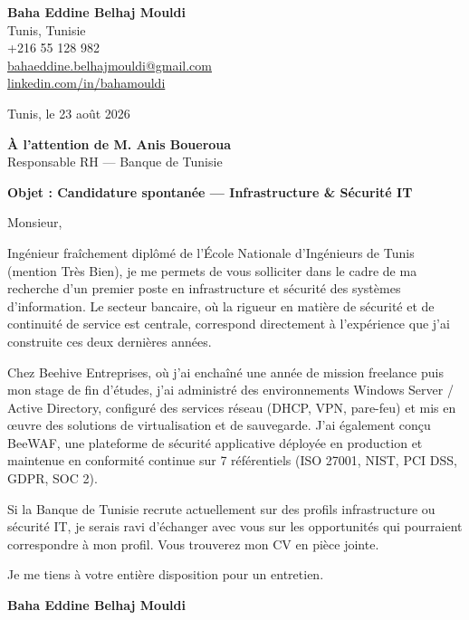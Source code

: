 \documentclass[a4paper,11pt]{article}
\begin{document}
\begin{flushright}
{\bfseries Baha Eddine Belhaj Mouldi}\\
Tunis, Tunisie\\
+216 55 128 982\\
\href{mailto:bahaeddine.belhajmouldi@gmail.com}{bahaeddine.belhajmouldi@gmail.com}\\
\href{https://linkedin.com/in/bahamouldi}{linkedin.com/in/bahamouldi}
\end{flushright}
\vspace{0.8cm}
\begin{flushleft}
Tunis, le 23 août 2026
\vspace{0.8cm}

{\bfseries À l'attention de M. Anis Boueroua}\\
Responsable RH --- Banque de Tunisie
\vspace{0.6cm}

{\bfseries Objet : Candidature spontanée --- Infrastructure \& Sécurité IT}
\end{flushleft}
\vspace{0.6cm}
Monsieur,

Ingénieur fraîchement diplômé de l'École Nationale d'Ingénieurs de Tunis (mention Très Bien), je me permets de vous solliciter dans le cadre de ma recherche d'un premier poste en infrastructure et sécurité des systèmes d'information. Le secteur bancaire, où la rigueur en matière de sécurité et de continuité de service est centrale, correspond directement à l'expérience que j'ai construite ces deux dernières années.

Chez Beehive Entreprises, où j'ai enchaîné une année de mission freelance puis mon stage de fin d'études, j'ai administré des environnements Windows Server / Active Directory, configuré des services réseau (DHCP, VPN, pare-feu) et mis en œuvre des solutions de virtualisation et de sauvegarde. J'ai également conçu BeeWAF, une plateforme de sécurité applicative déployée en production et maintenue en conformité continue sur 7 référentiels (ISO 27001, NIST, PCI DSS, GDPR, SOC 2).

Si la Banque de Tunisie recrute actuellement sur des profils infrastructure ou sécurité IT, je serais ravi d'échanger avec vous sur les opportunités qui pourraient correspondre à mon profil. Vous trouverez mon CV en pièce jointe.

Je me tiens à votre entière disposition pour un entretien.

\vspace{0.8cm}
\begin{flushright}
{\bfseries Baha Eddine Belhaj Mouldi}
\end{flushright}
\end{document}
